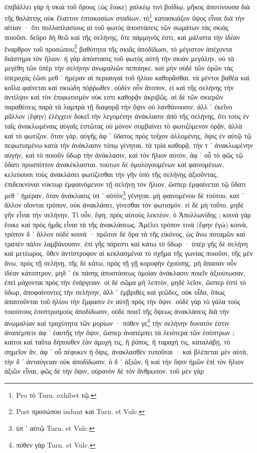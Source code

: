 \documentclass[a4paper, 11pt, oneside, polutonikogreek, german]{article}
\begin{document}
\paragraph{}
ἐπιβάλλει γὰρ ἡ σκιὰ τοῦ ὄρους (ὡς ἔοικε) χαλκέῳ τινὶ βοϊδίῳ, μῆκος ἀποτίνουσα διὰ τῆς θαλάττης οὐκ ἔλαττον ἑπτακοσίων σταδίων, τὸ\footnote{Pro τὸ Turn. exhibet τῷ.} κατασκιάζον ὕψος εἶναι διὰ τὴν αἰτίαν · ὅτι πολλαπλασίους αἱ τοῦ φωτὸς ἀποστάσεις τῶν σωμάτων τὰς σκιὰς ποιοῦσι. δεῦρο δὴ θεῶ καὶ τῆς σελήνης, ὅτε πάμμηνός ἐστι, καὶ μάλιστα τὴν ἰδέαν ἔναρθρον τοῦ προσώπου\footnote{Post προσώπου indunt καὶ Turn. et Vulc.} βαθύτητα τῆς σκιᾶς ἀποδίδωσι, τὸ μέγιστον ἀπέχοντα διάστημα τὸν ἥλιον. ἡ γὰρ ἀπόστασις τοῦ φωτὸς αὐτὴ τὴν σκιὰν μεγάλην, οὐ τὰ μεγέθη τῶν ὑπὲρ τὴν σελήνην ἀνωμαλιῶν πεποίηκε. καὶ μὴν οὐδὲ τῶν ὀρῶν τὰς ὑπεροχὰς ἐῶσι μεθ ᾽ ἡμέραν αἱ περιαυγαὶ τοῦ ἡλίου καθορᾶσθαι. τὰ μέντοι βαθέα καὶ κοῖλα φαίνεται καὶ σκιώδη πόῤῥωθεν. οὐδὲν οὖν ἄτοπον, εἰ καὶ τῆς σελήνης τὴν ἀντίλψιν καὶ τὸν ἐπιφωτισμὸν οὐκ εστι καθορᾷν ἀκριβῶς. αἱ δὲ τῶν σκιερῶν παραθέσεις παρὰ τὰ λαμπρὰ τῇ διαφορᾷ τὴν ὄψιν οὐ λανθάνουσιν. ἀλλ ᾽ ἐκεῖνο μᾶλλον (ἔφην) ἐλέγχειν δοκεῖ τὴν λεγομένην ἀνάκλασιν ἀπὸ τῆς σελήνης, ὅτι τοὺς ἐν ταῖς ἀνακλωμέναις αὐγαῖς ἑστῶτας οὐ μόνον συμβαίνει τὸ φωτιζόμενον ὁρᾷν, ἀλλὰ καὶ τὸ φωτίζον. ὅταν γὰρ, αὐγῆς ἀφ ᾽ ὕδατος πρὸς τοῖχον ἀλλομένης, ὄψις ἐν αὐτῷ τῷ πεφωτισμένω κατὰ τὴν ἀνάκλασιν τόπῳ γένηται, τὰ τρία καθορᾷ, τήν τ ᾽ ἀνακλωμένην αὐγὴν, καὶ τὸ ποιοῦν ὕδωρ τὴν ἀνάκλασιν, καὶ τὸν ἥλιον αὐτὸν, ἀφ ᾽ οὗ τὸ φῶς τῷ ὕδατι προσπίπτον ἀνακέκλασται. τούτων δὲ ὁμολογουμένων καὶ φαινομένων, κελεύουσι τοὺς ἀνακλάσει φωτίζεσθαι τὴν γῆν ὑπὸ τῆς σελήνης ἀξιοῦντας, ἐπιδεικνύναι νύκτωρ ἐμφαινόμενον τῇ σελήνῃ τὸν ἥλιον, ὥσπερ ἐμφαίνεται τῷ ὕδατι μεθ ᾽ ἡμέραν, ὅταν ἀνάκλασις ὑπ ᾽ αὐτὸν\footnote{ὑπ ᾽ αὐτῷ Turn. et Vulc.} γένηται. μὴ φαινομένου δὲ τούτου, κατ ᾽ ἄλλον οἴονται τρόπον, οὐκ ἀνακλάσει, γίνεσθαι τὸν φωτισμόν. εἰ δὲ μὴ τοῦτο, μηδὲ γῆν εἶναι τὴν σελήνην. Τί οὖν, ἔφη, πρὸς αὐτοὺς λεκτέον, ὁ Ἀπολλωνίδης ; κοινὰ γὰρ ἔοικε καὶ πρὸς ἡμᾶς εἶναι τὰ τῆς ἀνακλάσεως. Ἀμέλει τρόπον τινὰ (ἔφην ἐγὼ) κοινὰ, τρόπον δ ᾽ ἄλλον οὐδὲ κοινά · πρῶτον δὲ ὅρα τὰ τῆς εἰκόνος, ὡς ἄνω ποταμῶν καὶ τραπὲν πάλιν λαμβάνουσιν. ἐπὶ γῆς πάρεστι καὶ κάτω τὸ ὕδωρ · ὑπὲρ γῆς δὲ σελήνη καὶ μετέωρος. ὅθεν ἀντίστροφον αἱ κεκλασμέναι τὸ σχῆμα τῆς γωνίας ποιοῦσι, τῆς μὲν ἄνω, πρὸς τῇ σελήνῃ, τῆς δὲ κάτω, πρὸς τῇ γῇ κορυφὴν ἐχούσης. μὴ ἅπασαν οὖν ἰδέαν κάτοπτρον, μηδ ᾽ ἐκ πάσης ἀποστάσεως ὁμοίαν ἀνάκλασιν ποιεῖν ἀξιούτωσαν, ἐπεὶ μάχονται πρὸς τὴν ἐνάργειαν. οἱ δὲ σῶμα μὴ λεπτὸν, μηδὲ λεῖον, ὥσπερ ἐστὶ τὸ ὕδωρ, ἀποφαίνοντες τὴν σελήνην, ἀλλ ᾽ ἐμβριθὲς καὶ γεῶδες, οὐκ οἶδα, ὅπως ἀπαιτοῦνται τοῦ ἡλίου τὴν ἔμφασιν ἐν αὐτῇ πρὸς τὴν ὄψιν. οὐδὲ γὰρ τὸ γάλα τοὺς τοιούτους ἐσοπτρισμοὺς ἀποδίδωσιν, οὐδὲ ποιεῖ τῆς ὄψεως ἀνακλάσεις διὰ τὴν ἀνωμαλίαν καὶ τραχύτητα τῶν μορίων · πόθεν γε\footnote{πόθεν γὰρ Turn. et Vulc.} τὴν σελήνην δυνατόν ἐστιν ἀναπέμπειν ἀφ ᾽ ἑαυτῆς τὴν ὄψιν, ὥσπερ ἀναπέμπει τὰ λειότερα τῶν ἐσόπτρων ; καίτοι καὶ ταῦτα δήπουθεν ἐὰν ἀμυχή τις, ἢ ῥύπος, ἢ ταραχή τις, καταλάβῃ, τὸ σημεῖον ἂν, ἀφ ᾽ οὗ πέφυκεν ἡ ὄψις, ἀνακλασθὲν τυποῦται · καὶ βλέπεται μὲν αὐτὰ, τὴν δ ᾽ ἀνταύγειαν οὐκ ἀποδίδωσιν. ὁ δ ᾽ ἀξιῶν, ἢ καὶ τὴν ὄψιν ἡμῶν ἐπὶ τὸν ἥλιον ἀξιῶν εἶναι, φῶς δὲ τὴν ὄψιν, οὐρανὸν δὲ τὸν ἄνθρωπον. τοῦ μὲν γὰρ 
\end{document}
